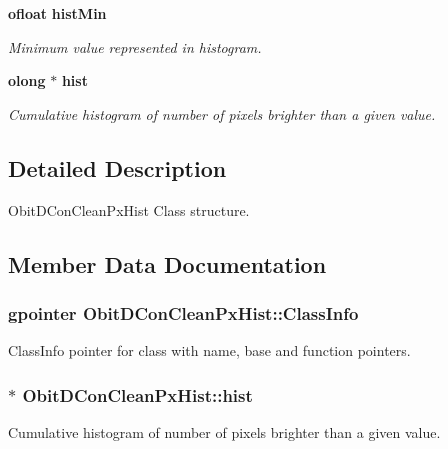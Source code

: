 \begin{CompactItemize}
{\bf ofloat} {\bf hist\-Min}
\begin{CompactList}\small\item\em Minimum value represented in histogram. \item\end{CompactList}\item 
{\bf olong} $\ast$ {\bf hist}
\begin{CompactList}\small\item\em Cumulative histogram of number of pixels brighter than a given value. \item\end{CompactList}\end{CompactItemize}


\subsection{Detailed Description}
Obit\-DCon\-Clean\-Px\-Hist Class structure. 



\subsection{Member Data Documentation}
\subsubsection{\setlength{\rightskip}{0pt plus 5cm}gpointer {\bf Obit\-DCon\-Clean\-Px\-Hist::Class\-Info}}\label{structObitDConCleanPxHist_o1}


Class\-Info pointer for class with name, base and function pointers. 

\subsubsection{$\ast$ {\bf Obit\-DCon\-Clean\-Px\-Hist::hist}}\label{structObitDConCleanPxHist_o7}


Cumulative histogram of number of pixels brighter than a given value. 

